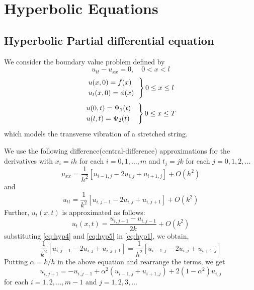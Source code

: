 \documentclass[../main-sheet.tex]{subfiles}
\begin{document}
\chapter{Hyperbolic Equations}
\section{Hyperbolic Partial differential equation}
We consider the boundary value problem defined by
\begin{equation}
    u_{tt}-u_{xx}=0,\quad 0<x<l
    \label{eq:hyp1}
\end{equation}
\begin{equation}
    \begin{rcases}
        \displaystyle u(x,0)=f(x)\quad\\
        \displaystyle u_t(x,0)=\phi(x)    
    \end{rcases} 0\leq x\leq l
    \label{eq:hyp2}
\end{equation}
\begin{equation}
    \begin{rcases}
        \displaystyle u(0,t)=\Psi_1(t)\quad\\
        \displaystyle u(l,t)=\Psi_2(t)    
    \end{rcases} 0\leq x\leq T
    \label{eq:hyp3}
\end{equation}
which models the transverse vibration of a stretched string.

We use the following difference(central-difference) approximations for the derivatives with \(x_i=ih\) for each \(i=0,1,\dots,m\) and \(t_j=jk\) for each \(j=0,1,2,\dots\)
\begin{equation}
    u_{xx}=\frac{1}{h^2}\left[ u_{i-1,j}-2u_{i,j}+u_{i+1,j} \right]+O(h^2) \label{eq:hyp4}
\end{equation}
and
\begin{equation}
    u_{tt}=\frac{1}{k^2}\left[ u_{i,j-1}-2u_{i,j}+u_{i,j+1} \right]+O(k^2) \label{eq:hyp5}
\end{equation}
Further, \(u_t(x,t)\) is approximated as follows:
\begin{equation}
    u_t(x,t)=\frac{u_{i,j+1}-u_{i,j-1}}{2k}+O(k^2) \label{eq:hyp6}
\end{equation}
substituting \eqref{eq:hyp4} and \eqref{eq:hyp5} in \eqref{eq:hyp1}, we obtain,
\[
    \frac{1}{k^2}\left[ u_{i,j-1}-2u_{i,j}+u_{i,j+1} \right]=\frac{1}{h^2}\left[ u_{i-1,j}-2u_{i,j}+u_{i+1,j} \right]
\]
Putting \(\alpha=k/h\) in the above equation and rearrange the terms, we get
\begin{equation}
    u_{i,j+1}=-u_{i,j-1}+\alpha^2(u_{i-1,j}+u_{i+1,j})+2(1-\alpha^2)u_{i,j} \label{eq:hyp7}
\end{equation}
for each \(i=1,2,\dots,m-1\) and \(j=1,2,3,\dots\)
\end{document}
